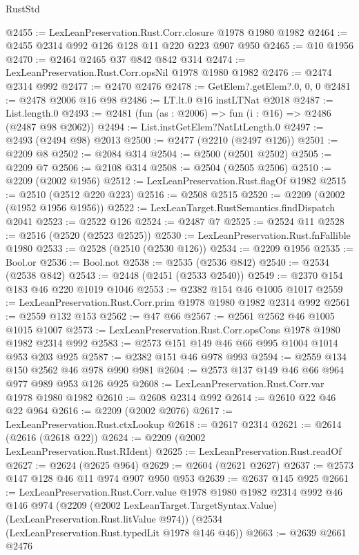 \begin{lexlean}{RustStd}
\begin{coremodule}
@2455 := LexLeanPreservation.Rust.Corr.closure @1978 @1980 @1982
@2464 := @2455 @2314 @992 @126 @128 @11 @220 @223 @907 @950
@2465 := @10 @1956
@2470 := @2464 @2465 @37 @842 @842 @314
@2474 := LexLeanPreservation.Rust.Corr.opsNil @1978 @1980 @1982
@2476 := @2474 @2314 @992
@2477 := @2470 @2476
@2478 := GetElem?.getElem?.{0, 0, 0}
@2481 := @2478 @2006 @16 @98
@2486 := LT.lt.{0} @16 instLTNat @2018
@2487 := List.length.{0}
@2493 := @2481 (fun (as : @2006) => fun (i : @16) => @2486 (@2487 @98 @2062))
@2494 := List.instGetElem?NatLtLength.{0}
@2497 := @2493 (@2494 @98) @2013
@2500 := @2477 (@2210 (@2497 @126))
@2501 := @2209 @8
@2502 := @2084 @314
@2504 := @2500 (@2501 @2502)
@2505 := @2209 @7
@2506 := @2108 @314
@2508 := @2504 (@2505 @2506)
@2510 := @2209 (@2002 @1956)
@2512 := LexLeanPreservation.Rust.flagOf @1982
@2515 := @2510 (@2512 @220 @223)
@2516 := @2508 @2515
@2520 := @2209 (@2002 (@1952 @1956 @1956))
@2522 := LexLeanTarget.RustSemantics.findDispatch @2041
@2523 := @2522 @126
@2524 := @2487 @7
@2525 := @2524 @11
@2528 := @2516 (@2520 (@2523 @2525))
@2530 := LexLeanPreservation.Rust.fnFallible @1980
@2533 := @2528 (@2510 (@2530 @126))
@2534 := @2209 @1956
@2535 := Bool.or
@2536 := Bool.not
@2538 := @2535 (@2536 @842)
@2540 := @2534 (@2538 @842)
@2543 := @2448 (@2451 (@2533 @2540))
@2549 := @2370 @154 @183 @46 @220 @1019 @1046
@2553 := @2382 @154 @46 @1005 @1017
@2559 := LexLeanPreservation.Rust.Corr.prim @1978 @1980 @1982 @2314 @992
@2561 := @2559 @132 @153
@2562 := @47 @66
@2567 := @2561 @2562 @46 @1005 @1015 @1007
@2573 := LexLeanPreservation.Rust.Corr.opsCons @1978 @1980 @1982 @2314 @992
@2583 := @2573 @151 @149 @46 @66 @995 @1004 @1014 @953 @203 @925
@2587 := @2382 @151 @46 @978 @993
@2594 := @2559 @134 @150 @2562 @46 @978 @990 @981
@2604 := @2573 @137 @149 @46 @66 @964 @977 @989 @953 @126 @925
@2608 := LexLeanPreservation.Rust.Corr.var @1978 @1980 @1982
@2610 := @2608 @2314 @992
@2614 := @2610 @22 @46 @22 @964
@2616 := @2209 (@2002 @2076)
@2617 := LexLeanPreservation.Rust.ctxLookup
@2618 := @2617 @2314
@2621 := @2614 (@2616 (@2618 @22))
@2624 := @2209 (@2002 LexLeanPreservation.Rust.RIdent)
@2625 := LexLeanPreservation.Rust.readOf
@2627 := @2624 (@2625 @964)
@2629 := @2604 (@2621 @2627)
@2637 := @2573 @147 @128 @46 @11 @974 @907 @950 @953
@2639 := @2637 @145 @925
@2661 := LexLeanPreservation.Rust.Corr.value
    @1978
    @1980
    @1982
    @2314
    @992
    @46
    @146
    @974
    (@2209 (@2002 LexLeanTarget.TargetSyntax.Value) (LexLeanPreservation.Rust.litValue @974))
    (@2534 (LexLeanPreservation.Rust.typedLit @1978 @146 @46))
@2663 := @2639 @2661 @2476

\end{coremodule}
\end{lexlean}

